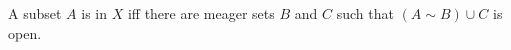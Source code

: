 A subset $A$ is  in $X$ iff there are meager sets $B$ and $C$ such that $(A \sim B) \cup C$ is open.
